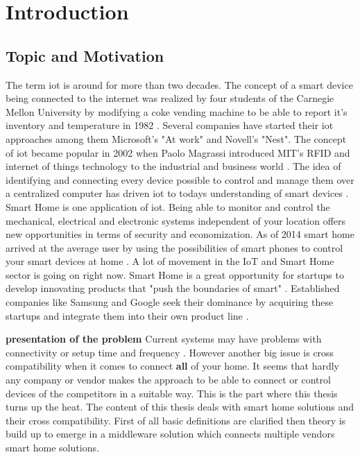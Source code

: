  \newpage
\section{Introduction}  %

\subsection{Topic and Motivation} %
	The term iot is around for more than two decades. The concept of a smart device being connected to the internet was realized by four students of the Carnegie Mellon University by modifying a coke vending machine to be able to report it's inventory and temperature in 1982 \parencite{cokeVendingMachineIoT}. Several companies have started their iot approaches among them Microsoft's "At work" and Novell's "Nest". The concept of iot became popular in 2002 when Paolo Magrassi introduced MIT's RFID and internet of things technology to the industrial and business world \parencite{E-Tagging}. The idea of identifying and connecting every device possible to control and manage them over a centralized computer has driven iot to todays understanding of smart devices \parencite{SmartObjects}. Smart Home is one application of iot. Being able to monitor and control the mechanical, electrical and electronic systems independent of your location offers new opportunities in terms of security and economization. As of 2014 smart home arrived at the average user by using the possibilities of smart phones to control your smart devices at home \parencite{IntroToHomeKit}. A lot of movement in the IoT and Smart Home sector is going on right now. Smart Home is a great opportunity for startups to develop innovating products that "push the boundaries of smart" \parencite{SmartHome-Techcrunch}. Established companies like Samsung and Google seek their dominance by acquiring these startups and integrate them into their own product line \parencite{SmartHome-Techcrunch}.


	\textbf{presentation of the problem}
		Current systems may have problems with connectivity or setup time and frequency \parencite{WhyIsMySmartHome}. However another big issue is cross compatibility when it comes to connect \textbf{all} of your home. It seems that hardly any company or vendor makes the approach to be able to connect or control devices of the competitors in a suitable way. This is the part where this thesis turns up the heat. The content of this thesis deals with smart home solutions and their cross compatibility. First of all basic definitions are clarified then theory is build up to emerge in a middleware solution which connects multiple vendors smart home solutions.

